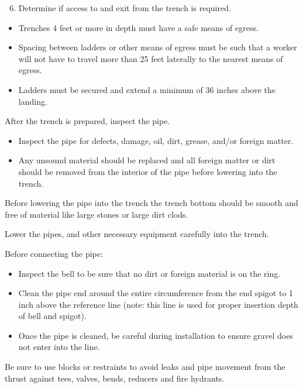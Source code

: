 \documentclass[10pt]{article}
\begin{document}
\begin{enumerate}
  \setcounter{enumi}{5}
  \item Determine if access to and exit from the trench is required.
\end{enumerate}
\begin{itemize}
  \item Trenches 4 feet or more in depth must have a safe means of egress.

  \item Spacing between ladders or other means of egress must be such that a worker will not have to travel more than 25 feet laterally to the nearest means of egress.

  \item Ladders must be secured and extend a minimum of 36 inches above the landing.

\end{itemize}
After the trench is prepared, inspect the pipe.

\begin{itemize}
  \item Inspect the pipe for defects, damage, oil, dirt, grease, and/or foreign matter.

  \item Any unsound material should be replaced and all foreign matter or dirt should be removed from the interior of the pipe before lowering into the trench.

\end{itemize}
Before lowering the pipe into the trench the trench bottom should be smooth and free of material like large stones or large dirt clods.

Lower the pipes, and other necessary equipment carefully into the trench.

Before connecting the pipe:

\begin{itemize}
  \item Inspect the bell to be sure that no dirt or foreign material is on the ring.

  \item Clean the pipe end around the entire circumference from the end spigot to 1 inch above the reference line (note: this line is used for proper insertion depth of bell and spigot).

  \item Once the pipe is cleaned, be careful during installation to ensure gravel does not enter into the line.

\end{itemize}
Be sure to use blocks or restraints to avoid leaks and pipe movement from the thrust against tees, valves, bends, reducers and fire hydrants.
\end{document}
